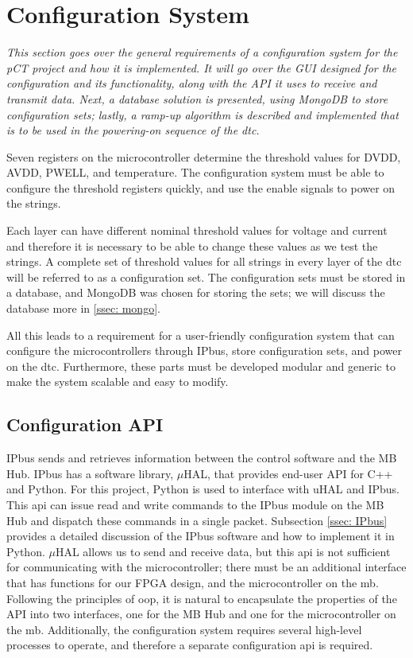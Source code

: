 \documentclass[main.tex]{subfiles}
\begin{document}
\section{Configuration System}
\label{section: configuration}
\textit{This section goes over the general requirements of a configuration system for the pCT project and how it is implemented. It will go over the GUI designed for the configuration and its functionality, along with the API it uses to receive and transmit data. Next, a database solution is presented, using MongoDB to store configuration sets; lastly, a ramp-up algorithm is described and implemented that is to be used in the powering-on sequence of the \gls{dtc}.}


 Seven registers on the microcontroller determine the threshold values for DVDD, AVDD, PWELL, and temperature. The configuration system must be able to configure the threshold registers quickly, and use the enable signals to power on the strings.

Each layer can have different nominal threshold values for voltage and current and therefore it is necessary to be able to change these values as we test the strings. A complete set of threshold values for all strings in every layer of the \gls{dtc} will be referred to as a configuration set. The configuration sets must be stored in a database, and MongoDB was chosen for storing the sets; we will discuss the database more in \autoref{ssec: mongo}.

All this leads to a requirement for a user-friendly configuration system that can configure the microcontrollers through IPbus, store configuration sets, and power on the \gls{dtc}. Furthermore, these parts must be developed modular and generic to make the system scalable and easy to modify.

\subsection{Configuration API}
\label{ssec: mcu_api}
IPbus sends and retrieves information between the control software and the MB Hub. IPbus has a software library, $\mu$HAL, that provides end-user API for C++ and Python. For this project, Python is used to interface with uHAL and IPbus. This \gls{api} can issue read and write commands to the IPbus module on the MB Hub and dispatch these commands in a single packet. Subsection \ref{ssec: IPbus} provides a detailed discussion of the IPbus software and how to implement it in Python. $\mu$HAL allows us to send and receive data, but this \gls{api} is not sufficient for communicating with the microcontroller; there must be an additional interface that has functions for our FPGA design, and the microcontroller on the \gls{mb}. Following the principles of \gls{oop}, it is natural to encapsulate the properties of the API into two interfaces, one for the MB Hub and one for the microcontroller on the \gls{mb}. Additionally, the configuration system requires several high-level processes to operate, and therefore a separate configuration \gls{api} is required.
\end{document}
